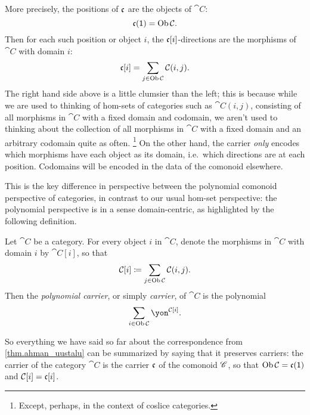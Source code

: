 \documentclass[Book-Poly]{subfiles}
\begin{document}
More precisely, the positions of $\mathfrak{c}$ are the objects of $\cat{C}$:
\begin{equation} \label{eqn.pos_obj}
    \mathfrak{c}(\textsf{1})=\operatorname{Ob}\mathcal{C}.
\end{equation}
Then for each such position or object $i$, the $\mathfrak{c}[i]$-directions are the morphisms of $\cat{C}$ with domain $i$:
\begin{equation} \label{eqn.dir_mor}
    \mathfrak{c}[i]=\sum_{j\in\operatorname{Ob}\mathcal{C}}\mathcal{C}(i,j).
\end{equation}
The right hand side above is a little clumsier than the left; this is because while we are used to thinking of hom-sets of categories such as $\cat{C}(i,j)$, consisting of all morphisms in $\cat{C}$ with a fixed domain and codomain, we aren't used to thinking about the collection of all morphisms in $\cat{C}$ with a fixed domain and an arbitrary codomain quite as often.%
\footnote{Except, perhaps, in the context of coslice categories.}
On the other hand, the carrier \emph{only} encodes which morphisms have each object as its domain, i.e.\ which directions are at each position.
Codomains will be encoded in the data of the comonoid elsewhere.

This is the key difference in perspective between the polynomial comonoid perspective of categories, in contrast to our usual hom-set perspective: the polynomial perspective is in a sense domain-centric, as highlighted by the following definition.

\begin{definition}
Let $\cat{C}$ be a category.
For every object $i$ in $\cat{C}$, denote the morphisms in $\cat{C}$ with domain $i$ by $\cat{C}[i]$, so that
\[
    \mathcal{C}[i]\coloneqq\sum_{j\in\operatorname{Ob}\mathcal{C}}\mathcal{C}(i,j).
\]
Then the \emph{polynomial carrier}, or simply \emph{carrier}, of $\cat{C}$ is the polynomial
\[
    \sum_{i\in\Ob\cat{C}}\yon^{\cat{C}[i]}.
\]
\end{definition}

So everything we have said so far about the correspondence from \cref{thm.ahman_uustalu} can be summarized by saying that it preserves carriers: the carrier of the category $\cat{C}$ is the carrier $\mathfrak{c}$ of the comonoid $\mathscr{C}$, so that $\operatorname{Ob}\mathcal{C}=\mathfrak{c}(\textsf{1})$ and $\mathcal{C}[i]=\mathfrak{c}[i]$.
\end{document}
